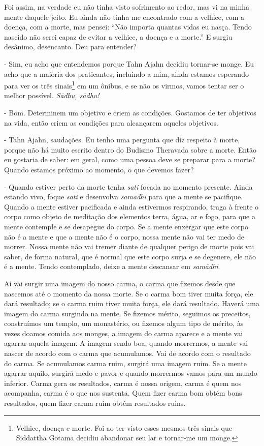 Foi assim, na verdade eu não tinha visto sofrimento ao redor, mas vi
na minha mente daquele jeito. Eu ainda não tinha me encontrado com a
velhice, com a doença, com a morte, mas pensei: “Não importa quantas
vidas eu nasça. Tendo nascido não serei capaz de evitar a velhice, a
doença e a morte.” E surgiu desânimo, desencanto. Deu para entender?

- Sim, eu acho que entendemos porque Tahn Ajahn decidiu
tornar-se monge. Eu acho que a maioria dos praticantes, incluindo a
mim, ainda estamos esperando para ver os três sinais\footnote{Velhice,
doença e morte. Foi ao ter visto esses mesmos três sinais que Siddattha
Gotama decidiu abandonar seu lar e tornar-me um monge. } em um ônibus,
e se não os virmos, vamos tentar ser o melhor possível.
\textit{S\=adhu, s\=adhu!}

- Bom. Determinem um objetivo e criem as condições. Gostamos de
ter objetivos na vida, então criem as condições para alcançarem aqueles
objetivos. 

- Tahn Ajahn, saudações. Eu tenho uma pergunta que diz respeito à
morte, porque não há muito escrito dentro do Budismo Theravada sobre a
morte. Então eu gostaria de saber: em geral, como uma pessoa deve se
preparar para a morte? Quando estamos próximo ao momento, o que devemos
fazer?

- Quando estiver perto da morte tenha \textit{sati }focada no
momento presente. Ainda estando vivo, foque \textit{sati }e desenvolva
\textit{sam\=adhi }para que a mente se pacifique. Quando a mente
estiver pacificada e ainda estivermos respirando, traga à frente o
corpo como objeto de meditação dos elementos terra, água, ar e fogo,
para que a mente contemple e se desapegue do corpo. Se a mente enxergar
que este corpo não é a mente e que a mente não é o corpo, nossa mente
não vai ter medo de morrer. Nossa mente não vai tremer diante de
qualquer perigo de morte pois vai saber, de forma natural, que é normal
que este corpo surja e se degenere, ele não é a mente. Tendo
contemplado, deixe a mente descansar em \textit{sam\=adhi}.

Aí vai surgir uma imagem do nosso carma, o carma que fizemos desde
que nascemos até o momento da nossa morte. Se o carma bom tiver muita
força, ele dará resultado; se o carma ruim tiver muita força, ele dará
resultado. Haverá uma imagem do carma surgindo na mente. Se fizemos
mérito, seguimos os preceitos, construímos um templo, um monastério, ou
fizemos algum tipo de mérito, às vezes doamos comida aos monges, a
imagem do carma aparece e a mente vai agarrar aquela imagem. A imagem
sendo boa, quando morrermos, a mente vai nascer de acordo com o carma
que acumulamos. Vai de acordo com o resultado do carma. Se acumulamos
carma ruim, surgirá uma imagem ruim. Se a mente agarrar aquilo, surgirá
medo e pavor e quando morrermos vamos para um mundo inferior. Carma
gera os resultados, carma é nossa origem, carma é quem nos acompanha,
carma é o que nos sustenta. Quem fizer carma bom obtém bons resultados,
quem fizer carma ruim obtém resultados ruins.

